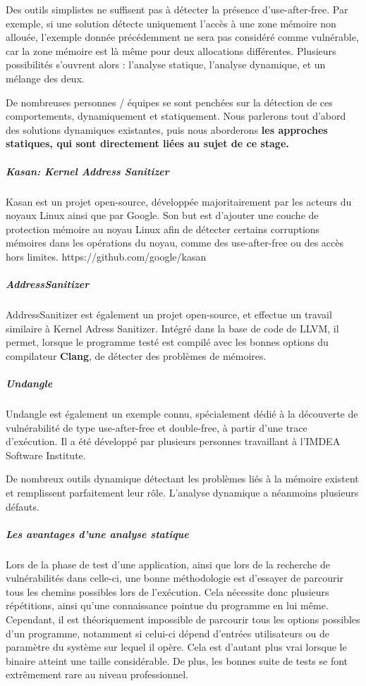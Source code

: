 Des outils simplistes ne suffisent pas à détecter la présence d'use-after-free.\newline
Par exemple, si une solution détecte uniquement l'accès à une zone mémoire non allouée, l'exemple
donnée précédemment ne sera pas considéré comme vulnérable, car la zone mémoire est là même pour deux
allocations différentes. Plusieurs possibilités s'ouvrent alors : l'analyse statique, l'analyse dynamique,
et un mélange des deux.

De nombreuses personnes / équipes se sont penchées sur la détection de ces comportements, dynamiquement et
statiquement. Nous parlerons tout d'abord des solutions dynamiques existantes, puis nous aborderons \textbf{les approches
statiques, qui sont directement liées au sujet de ce stage.}

\subparagraph{Kasan: Kernel Address Sanitizer}
Kasan est un projet open-source, développée majoritairement
par les acteurs du noyaux Linux ainsi que par Google. Son but est d'ajouter une couche de protection
mémoire au noyau Linux afin de détecter certains corruptions mémoires dans les opérations du noyau, comme
des use-after-free ou des accès hors limites.
https://github.com/google/kasan

\subparagraph{AddressSanitizer}
AddressSanitizer est également un projet open-source, et effectue
un travail similaire à Kernel Adress Sanitizer. Intégré dans la base de code de
LLVM, il permet, lorsque le programme testé est compilé avec les bonnes options du compilateur \textbf{Clang},
de détecter des problèmes de mémoires.

\subparagraph{Undangle}
Undangle est également un exemple connu, spécialement dédié à la découverte de vulnérabilité
de type use-after-free et double-free, à partir d'une trace d'exécution. Il a été développé par plusieurs
personnes travaillant à l'IMDEA Software Institute.


De nombreux outils dynamique détectant les problèmes liés à la mémoire existent et remplissent parfaitement leur rôle.
L'analyse dynamique a néanmoins plusieurs défauts.\newline

\subparagraph{Les avantages d'une analyse statique}

Lors de la phase de test d'une application, ainsi que lors de la recherche de vulnérabilités dans celle-ci, une bonne méthodologie
est d'essayer de parcourir tous les chemins possibles lors de l'exécution. Cela nécessite donc plusieurs répétitions, ainsi qu'une connaissance
pointue du programme en lui même.\newline
Cependant, il est théoriquement impossible de parcourir tous les options possibles d'un programme, notamment si
celui-ci dépend d'entrées utilisateurs ou de paramètre du système sur lequel il opère. Cela est d'autant plus vrai lorsque le binaire atteint une taille
considérable. De plus, les bonnes suite de tests se font extrêmement rare au niveau professionnel.

